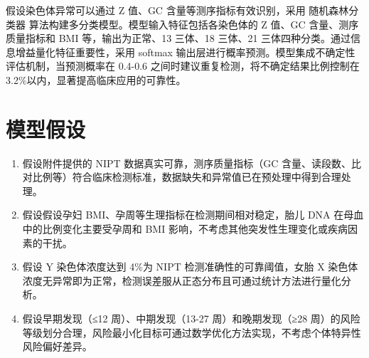 \documentclass[withoutpreface,bwprint]{cumcmthesis} %
\begin{document}
假设染色体异常可以通过 Z 值、GC 含量等测序指标有效识别，采用 随机森林分类器 算法构建多分类模型。模型输入特征包括各染色体的 Z 值、GC 含量、测序质量指标和 BMI 等，输出为正常、13 三体、18 三体、21 三体四种分类。通过信息增益量化特征重要性，采用 softmax 输出层进行概率预测。模型集成不确定性评估机制，当预测概率在 0.4-0.6 之间时建议重复检测，将不确定结果比例控制在 3.2\%以内，显著提高临床应用的可靠性。
\section{模型假设}
\begin{enumerate}
    \item 假设附件提供的 NIPT 数据真实可靠，测序质量指标（GC 含量、读段数、比对比例等）符合临床检测标准，数据缺失和异常值已在预处理中得到合理处理。
    \item 假设假设孕妇 BMI、孕周等生理指标在检测期间相对稳定，胎儿 DNA 在母血中的比例变化主要受孕周和 BMI 影响，不考虑其他突发性生理变化或疾病因素的干扰。
    \item 假设 Y 染色体浓度达到 4\%为 NIPT 检测准确性的可靠阈值，女胎 X 染色体浓度无异常即为正常，检测误差服从正态分布且可通过统计方法进行量化分析。
    \item 假设早期发现（≤12 周）、中期发现（13-27 周）和晚期发现（≥28 周）的风险等级划分合理，风险最小化目标可通过数学优化方法实现，不考虑个体特异性风险偏好差异。
\end{enumerate}

\end{document}
